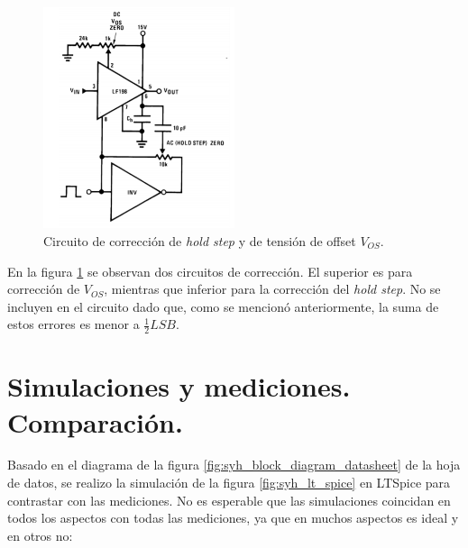 \documentclass[../../ASSD_TP1_G7.tex]{subfiles}
\begin{document}
		\begin{figure}[H]
			\centering
			\includegraphics[width = 0.5\textwidth]{figures/offset_adjust_schematic.png}
			\caption{Circuito de correcci\'on de \textit{hold step} y de tensi\'on de offset $V_{OS}$.}
			\label{fig:syh_offset_correction_datasheet}
		\end{figure}	
		
		En la figura \ref{fig:syh_offset_correction_datasheet} se observan dos circuitos de correcci\'on. El superior es para correcci\'on de $V_{OS}$, mientras que inferior para la correcci\'on del \textit{hold step}. No se incluyen en el circuito dado que, como se mencion\'o anteriormente, la suma de estos errores es menor a $\frac{1}{2}LSB$.

\section{Simulaciones y mediciones. Comparaci\'on.}
Basado en el diagrama de la figura \ref{fig:syh_block_diagram_datasheet} de la hoja de datos, se realizo la simulaci\'on de la figura \ref{fig:syh_lt_spice} en LTSpice para contrastar con las mediciones. No es esperable que las simulaciones coincidan en todos los aspectos con todas las mediciones, ya que en muchos aspectos es ideal y en otros no:
\end{document}
